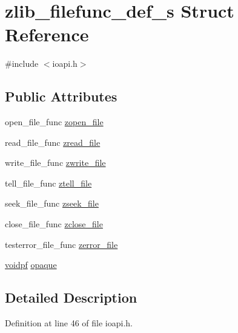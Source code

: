 \hypertarget{structzlib__filefunc__def__s}{\section{zlib\+\_\+filefunc\+\_\+def\+\_\+s Struct Reference}
\label{structzlib__filefunc__def__s}
}


{\ttfamily \#include $<$ioapi.\+h$>$}

\subsection*{Public Attributes}
\begin{DoxyCompactItemize}
\item 
open\+\_\+file\+\_\+func \hyperlink{structzlib__filefunc__def__s_a49b78a559140e495b94af4d9dfe5c4e9}{zopen\+\_\+file}
\item 
read\+\_\+file\+\_\+func \hyperlink{structzlib__filefunc__def__s_ab14f748de7516525e5d2b78c47aca92e}{zread\+\_\+file}
\item 
write\+\_\+file\+\_\+func \hyperlink{structzlib__filefunc__def__s_a710b490fec793486ef5bedd9f2e1136d}{zwrite\+\_\+file}
\item 
tell\+\_\+file\+\_\+func \hyperlink{structzlib__filefunc__def__s_ac8b933601443cdd83f8cc02004c77d0d}{ztell\+\_\+file}
\item 
seek\+\_\+file\+\_\+func \hyperlink{structzlib__filefunc__def__s_a4747bdf97a3f44fe4b958114c11e1dcf}{zseek\+\_\+file}
\item 
close\+\_\+file\+\_\+func \hyperlink{structzlib__filefunc__def__s_ac46ac7ec0540dce117dab3f210d26763}{zclose\+\_\+file}
\item 
testerror\+\_\+file\+\_\+func \hyperlink{structzlib__filefunc__def__s_a61182b5b3ff83fb509b57ab4d2d9816d}{zerror\+\_\+file}
\item 
\hyperlink{ioapi_8h_a39ab6d73c1cd44bc17064c2dcbb3e753}{voidpf} \hyperlink{structzlib__filefunc__def__s_a494b6d634b61bdc7fc7caed8e4fbe3f4}{opaque}
\end{DoxyCompactItemize}


\subsection{Detailed Description}


Definition at line 46 of file ioapi.\+h.



